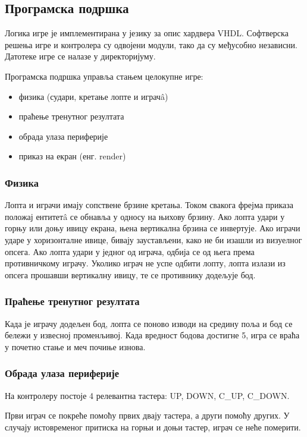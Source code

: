 \documentclass{article}
\begin{document}
\subsection{Програмска подршка}
Логика игре је имплементирана у језику за опис хардвера VHDL. Софтверска решења игре и контролера су одвојени модули, тако да су међусобно независни. Датотеке игре се налазе у директоријуму.\par
Програмска подршка управља стањем целокупне игре: 
\begin{itemize}
\item физика (судари, кретање лопте и играчâ)
\item праћење тренутног резултата
\item обрада улаза периферије
\item приказ на екран (енг. render)
\end{itemize}

\subsubsection{Физика}
Лопта и играчи имају сопствене брзине кретања. Током свакога фрејма приказа положај ентитетâ се обнавља у односу на њихову брзину. Ако лопта удари у горњу или доњу ивицу екрана, њена вертикална брзина се инвертује. Ако играчи ударе у хоризонталне ивице, бивају заустављени, како не би изашли из визуелног опсега. Ако лопта удари у једног од играча, одбија се од њега према противничкому играчу. Уколико играч не успе одбити лопту, лопта излази из опсега прошавши вертикалну ивицу, те се противнику додељује бод.

\subsubsection{Праћење тренутног резултата}
Када је играчу додељен бод, лопта се поново изводи на средину поља и бод се бележи у извесној променљивој. Када вредност бодова достигне 5, игра се враћа у почетно стање и меч почиње изнова.

\subsubsection{Обрада улаза периферије}
На контролеру постоје 4 релевантна тастера: UP, DOWN, C\_UP, C\_DOWN.\par
Први играч се покреће помоћу првих двају тастера, а други помоћу других. У случају истовременог притиска на горњи и доњи тастер, играч се неће померити.
\end{document}
